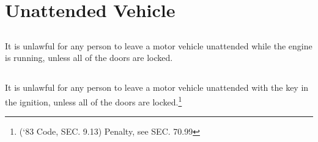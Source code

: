\section{Unattended Vehicle}
\subsection{}
It is unlawful for any person to leave a motor vehicle unattended while the engine is running, unless all of the doors are locked.
\subsection{}
It is unlawful for any person to leave a motor vehicle unattended with the key in the ignition, unless all of the doors are locked.\footnote{(‘83 Code, SEC. 9.13)  Penalty, see SEC. 70.99}

